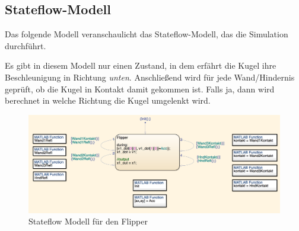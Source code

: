\documentclass[]{scrartcl}
\begin{document}
\subsection{Stateflow-Modell}

Das folgende Modell veranschaulicht das Stateflow-Modell, das die Simulation durchführt.

Es gibt in diesem Modell nur einen Zustand, in dem erfährt die Kugel ihre Beschleunigung in Richtung \textit{unten}. Anschließend wird für jede Wand/Hindernis geprüft, ob die Kugel in Kontakt damit gekommen ist. Falls ja, dann wird berechnet in welche Richtung die Kugel umgelenkt wird.

\begin{figure}[H]
\centering
\includegraphics[width=1\linewidth]{./flipper_modell}
\caption{Stateflow Modell für den Flipper}
\label{fig:flipper_modell}
\end{figure}
\end{document}
